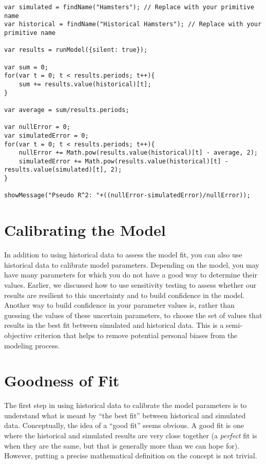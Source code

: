 \documentclass[]{memoir}
\begin{document}
\begin{lstlisting}
var simulated = findName("Hamsters"); // Replace with your primitive name
var historical = findName("Historical Hamsters"); // Replace with your primitive name

var results = runModel({silent: true});

var sum = 0;
for(var t = 0; t < results.periods; t++){
    sum += results.value(historical)[t];
}

var average = sum/results.periods;

var nullError = 0;
var simulatedError = 0;
for(var t = 0; t < results.periods; t++){
    nullError += Math.pow(results.value(historical)[t] - average, 2);
    simulatedError += Math.pow(results.value(historical)[t] - results.value(simulated)[t], 2);
}

showMessage("Pseudo R^2: "+((nullError-simulatedError)/nullError));
\end{lstlisting}

\section{Calibrating the Model}

In addition to using historical data to assess the model fit, you can
also use historical data to calibrate model parameters. Depending on the
model, you may have many parameters for which you do not have a good way
to determine their values. Earlier, we discussed how to use sensitivity
testing to assess whether our results are resilient to this uncertainty
and to build confidence in the model. Another way to build confidence in
your parameter values is, rather than guessing the values of these
uncertain parameters, to choose the set of values that results in the
best fit between simulated and historical data. This is a semi-objective
criterion that helps to remove potential personal biases from the
modeling process.

\section{Goodness of Fit}

The first step in using historical data to calibrate the model
parameters is to understand what is meant by ``the best fit'' between
historical and simulated data. Conceptually, the idea of a ``good fit''
seems obvious. A good fit is one where the historical and simulated
results are very close together (a \emph{perfect} fit is when they are
the same, but that is generally more than we can hope for). However,
putting a precise mathematical definition on the concept is not trivial.
\end{document}
